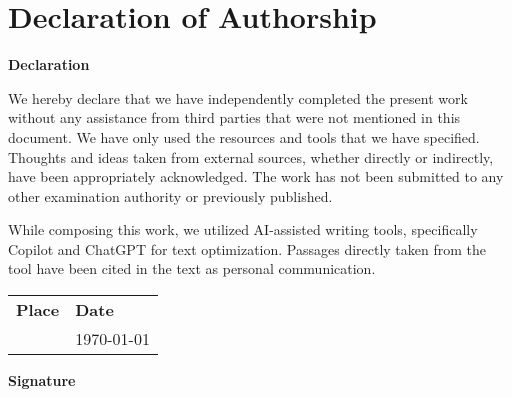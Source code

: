 \section{Declaration of Authorship}
\vspace{0.8cm}
\textbf{Declaration}\

We hereby declare that we have independently completed the present work without any assistance from third parties that were not mentioned in this document. We have only used the resources and tools that we have specified. Thoughts and ideas taken from external sources, whether directly or indirectly, have been appropriately acknowledged. The work has not been submitted to any other examination authority or previously published.\

While composing this work, we utilized AI-assisted writing tools, specifically Copilot and ChatGPT for text optimization. Passages directly taken from the tool have been cited in the text as personal communication.
\vspace{0.8cm}\

\begin{tabular}{l l}
	\textbf{Place} & \textbf{Date} \\
	\Place & \today
\end{tabular}
\vspace{0.8cm}

\textbf{Signature}\
\vspace{0.2cm}
\AuthorOne \hspace{4cm} \AuthorTwo

\clearpage


